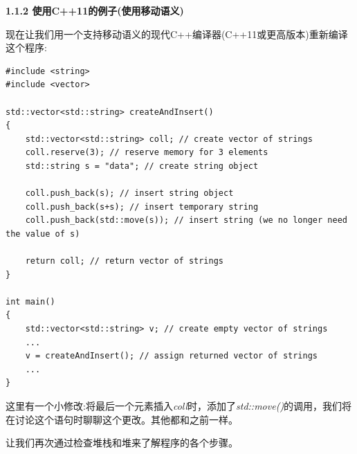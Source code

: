 \hspace*{\fill} \par %
\textbf{1.1.2 使用C++11的例子(使用移动语义)}

现在让我们用一个支持移动语义的现代C++编译器(C++11或更高版本)重新编译这个程序:\par

{\color{red}{basics/motiv11.cpp}}

\begin{lstlisting}[caption={}]
#include <string>
#include <vector>

std::vector<std::string> createAndInsert()
{
	std::vector<std::string> coll; // create vector of strings
	coll.reserve(3); // reserve memory for 3 elements
	std::string s = "data"; // create string object
	
	coll.push_back(s); // insert string object
	coll.push_back(s+s); // insert temporary string
	coll.push_back(std::move(s)); // insert string (we no longer need the value of s)
	
	return coll; // return vector of strings
}

int main()
{
	std::vector<std::string> v; // create empty vector of strings
	...
	v = createAndInsert(); // assign returned vector of strings
	...
}
\end{lstlisting}

这里有一个小修改:将最后一个元素插入\textit{coll}时，添加了\textit{std::move()}的调用，我们将在讨论这个语句时聊聊这个更改。其他都和之前一样。\par

让我们再次通过检查堆栈和堆来了解程序的各个步骤。\par


